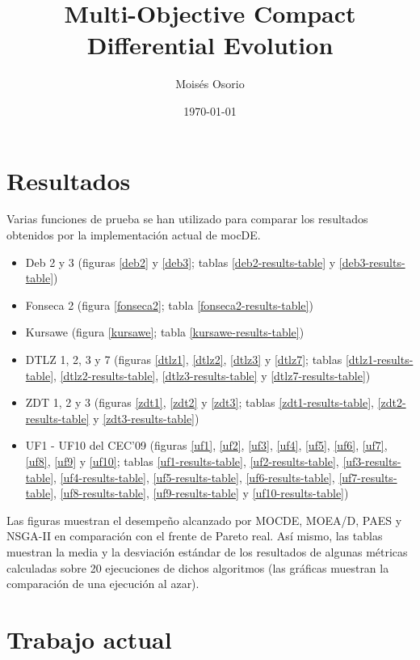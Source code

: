 \documentclass[english]{article}
\begin{document}
\makeatletter
\title{Multi-Objective Compact Differential Evolution}
\author{Moisés Osorio}
\date{\today}
\makeatother
\maketitle

\section*{Resultados}

Varias funciones de prueba se han utilizado para comparar los resultados obtenidos por la implementación actual de mocDE.
\begin{itemize}
\item Deb 2 y 3 (figuras \ref{deb2} y \ref{deb3}; tablas \ref{deb2-results-table} y \ref{deb3-results-table})
\item Fonseca 2 (figura \ref{fonseca2}; tabla \ref{fonseca2-results-table})
\item Kursawe (figura \ref{kursawe}; tabla \ref{kursawe-results-table})
\item DTLZ 1, 2, 3 y 7 (figuras \ref{dtlz1}, \ref{dtlz2}, \ref{dtlz3} y \ref{dtlz7}; tablas \ref{dtlz1-results-table}, \ref{dtlz2-results-table}, \ref{dtlz3-results-table} y \ref{dtlz7-results-table})
\item ZDT 1, 2 y 3 (figuras \ref{zdt1}, \ref{zdt2} y \ref{zdt3}; tablas \ref{zdt1-results-table}, \ref{zdt2-results-table} y \ref{zdt3-results-table})
\item UF1 - UF10 del CEC'09 (figuras \ref{uf1}, \ref{uf2}, \ref{uf3}, \ref{uf4}, \ref{uf5}, \ref{uf6}, \ref{uf7}, \ref{uf8}, \ref{uf9} y \ref{uf10}; tablas \ref{uf1-results-table}, \ref{uf2-results-table}, \ref{uf3-results-table}, \ref{uf4-results-table}, \ref{uf5-results-table}, \ref{uf6-results-table}, \ref{uf7-results-table}, \ref{uf8-results-table}, \ref{uf9-results-table} y \ref{uf10-results-table})
\end{itemize}

Las figuras muestran el desempeño alcanzado por MOCDE, MOEA/D, PAES y NSGA-II en comparación con el frente de Pareto real. Así mismo, las tablas muestran la media y la desviación estándar de los resultados de algunas métricas calculadas sobre 20 ejecuciones de dichos algoritmos (las gráficas muestran la comparación de una ejecución al azar).


\section*{Trabajo actual}
\end{document}
